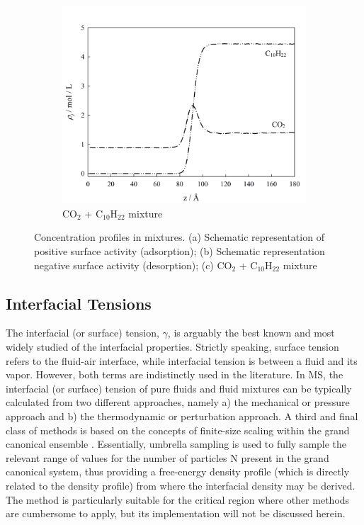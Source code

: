 \documentclass[9pt,bestpractices]{livecoms}
\begin{document}
\begin{figure}
\begin{subfigure}{0.4\textwidth}
    \includegraphics[width=1\textwidth]{gfx/image4.png}
		\caption{CO$_{2}$ + C$_{10}$H$_{22}$ mixture} %
	\end{subfigure}
	\caption{Concentration profiles in mixtures. (a) Schematic representation of positive surface activity (adsorption); (b) Schematic representation negative surface activity (desorption); (c) CO$_{2}$ + C$_{10}$H$_{22}$ mixture} %
  \label{fig:2}
\end{figure}


\subsection{Interfacial Tensions}

The interfacial (or surface) tension, $\gamma$, is arguably the best known and
most widely studied of the interfacial properties. Strictly speaking, surface
tension refers to the fluid-air interface, while interfacial tension is between
a fluid and its vapor. However, both terms are indistinctly used in the
literature. In MS, the interfacial (or surface) tension of pure fluids and
fluid mixtures can be typically calculated from two different approaches,
namely a) the mechanical or pressure approach and b) the thermodynamic or
perturbation approach. A third and final class of methods is based on the
concepts of finite-size scaling within the grand canonical ensemble 
\citep{binder1982,errington2003}. Essentially, umbrella
sampling is used to fully sample the relevant range of values for the number of
particles N present in the grand canonical system, thus providing a free-energy
density profile (which is directly related to the density profile) from where
the interfacial density may be derived. The method is particularly suitable for
the critical region where other methods are cumbersome to apply, but its
implementation \cite{allen2017,schrader2009} will not be discussed
herein.
\end{document}
